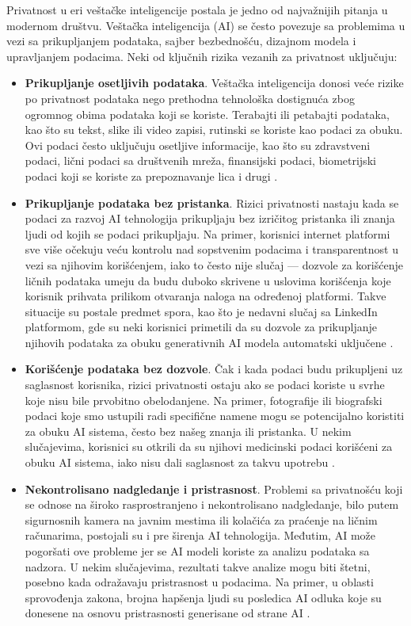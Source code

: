 \documentclass[a4paper,12pt]{article}
\begin{document}
Privatnost u eri veštačke inteligencije postala je jedno od najvažnijih pitanja u modernom društvu. Veštačka inteligencija (AI) se često povezuje sa problemima u vezi sa prikupljanjem podataka, sajber bezbednošću, dizajnom modela i upravljanjem podacima. Neki od ključnih rizika vezanih za privatnost uključuju:

\begin{itemize}
    \item \textbf{Prikupljanje osetljivih podataka}.  
    Veštačka inteligencija donosi veće rizike po privatnost podataka nego prethodna tehnološka dostignuća zbog ogromnog obima podataka koji se koriste. Terabajti ili petabajti podataka, kao što su tekst, slike ili video zapisi, rutinski se koriste kao podaci za obuku. Ovi podaci često uključuju osetljive informacije, kao što su zdravstveni podaci, lični podaci sa društvenih mreža, finansijski podaci, biometrijski podaci koji se koriste za prepoznavanje lica i drugi \cite{ibm_ai_privacy}.  

    \item \textbf{Prikupljanje podataka bez pristanka}.  
    Rizici privatnosti nastaju kada se podaci za razvoj AI tehnologija prikupljaju bez izričitog pristanka ili znanja ljudi od kojih se podaci prikupljaju. Na primer, korisnici internet platformi sve više očekuju veću kontrolu nad sopstvenim podacima i transparentnost u vezi sa njihovim korišćenjem, iako to često nije slučaj — dozvole za korišćenje ličnih podataka umeju da budu duboko skrivene u uslovima korišćenja koje korisnik prihvata prilikom otvaranja naloga na određenoj platformi. Takve situacije su postale predmet spora, kao što je nedavni slučaj sa LinkedIn platformom, gde su neki korisnici primetili da su dozvole za prikupljanje njihovih podataka za obuku generativnih AI modela automatski uključene \cite{ibm_ai_privacy}.

    \item \textbf{Korišćenje podataka bez dozvole}. 
    Čak i kada podaci budu prikupljeni uz saglasnost korisnika, rizici privatnosti ostaju ako se podaci koriste u svrhe koje nisu bile prvobitno obelodanjene. Na primer, fotografije ili biografski podaci koje smo ustupili radi specifične namene mogu se potencijalno koristiti za obuku AI sistema, često bez našeg znanja ili pristanka. U nekim slučajevima, korisnici su otkrili da su njihovi medicinski podaci korišćeni za obuku AI sistema, iako nisu dali saglasnost za takvu upotrebu \cite{ibm_ai_privacy}.  

    \item \textbf{Nekontrolisano nadgledanje i pristrasnost}. 
    Problemi sa privatnošću koji se odnose na široko rasprostranjeno i nekontrolisano nadgledanje, bilo putem sigurnosnih kamera na javnim mestima ili kolačića za praćenje na ličnim računarima, postojali su i pre širenja AI tehnologija. Međutim, AI može pogoršati ove probleme jer se AI modeli koriste za analizu podataka sa nadzora. U nekim slučajevima, rezultati takve analize mogu biti štetni, posebno kada odražavaju pristrasnost u podacima. Na primer, u oblasti sprovođenja zakona, brojna hapšenja ljudi su posledica AI odluka koje su donesene na osnovu pristrasnosti generisane od strane AI \cite{ibm_ai_privacy}.  


\end{itemize}
\end{document}
